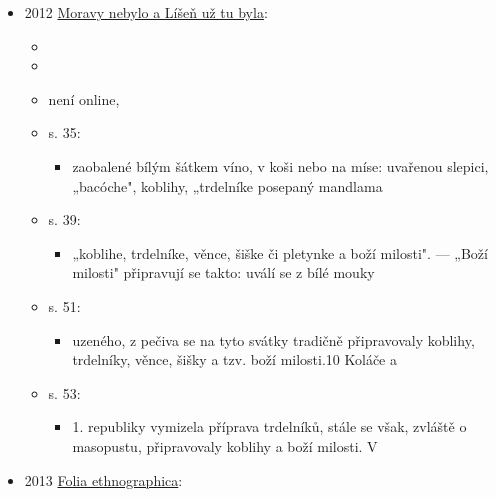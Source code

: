\begin{itemize}
  \begin{itemize}
  \tightlist
  \item
    Jižní Morava: vlastivědný sborník. 2012. Brno: Muzejní a vlastivědná
    společnost, roč. 48, č. 1, s. 184. ISSN 0449-0436.
  \item
    není online, 
  \item
    s. 184: 121 Krapfenholz znamená hůlku na pečení trubiček/trdelníků -
    na ni se namotalo těsto. 122 VRBKA: Sitten und
  \end{itemize}
\item
  2012
  \href{https://ndk.cz/uuid/uuid:b11754fa-8bdf-11f1-a394-de0db772653a}{Moravy
  nebylo a Líšeň už tu byla}:

  \begin{itemize}
  \tightlist
  \item
  \item
  \item
    není online, 
  \item
    s. 35:

    \begin{itemize}
    \tightlist
    \item
      zaobalené bílým šátkem víno, v koši nebo na míse: uvařenou
      slepici, „bacóche", koblihy, „trdelníke posepaný mandlama
    \end{itemize}
  \item
    s. 39:

    \begin{itemize}
    \tightlist
    \item
      „koblihe, trdelníke, věnce, šiške či pletynke a boží milosti". ---
      „Boží milosti" připravují se takto: uválí se z bílé mouky
    \end{itemize}
  \item
    s. 51:

    \begin{itemize}
    \tightlist
    \item
      uzeného, z pečiva se na tyto svátky tradičně připravovaly koblihy,
      trdelníky, věnce, šišky a tzv. boží milosti.10 Koláče a
    \end{itemize}
  \item
    s. 53:

    \begin{itemize}
    \tightlist
    \item
      1. republiky vymizela příprava trdelníků, stále se však, zvláště o
      masopustu, připravovaly koblihy a boží milosti. V
    \end{itemize}
  \end{itemize}
\item
  2013
  \href{https://ndk.cz/view/uuid:1b545920-4f78-11e4-a830-005056827e51?page=uuid:226078c0-5c34-11e4-a6f0-5ef3fc9ae867}{Folia
  ethnographica}:


\end{itemize}
